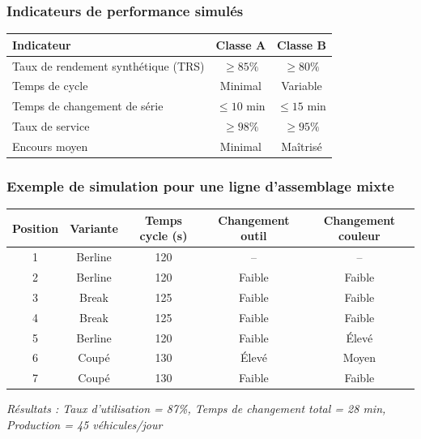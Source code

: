 \documentclass{article}
\begin{document}
\begin{table}[h]
\subsubsection{Indicateurs de performance simulés}

\begin{table}[h]
\centering
\begin{tabular}{|l|c|c|}
\hline
\textbf{Indicateur} & \textbf{Classe A} & \textbf{Classe B} \\
\hline
Taux de rendement synthétique (TRS) & $\geq 85\%$ & $\geq 80\%$ \\
Temps de cycle & Minimal & Variable \\
Temps de changement de série & $\leq 10$ min & $\leq 15$ min \\
Taux de service & $\geq 98\%$ & $\geq 95\%$ \\
Encours moyen & Minimal & Maîtrisé \\
\hline
\end{tabular}
\end{table}

\subsubsection{Exemple de simulation pour une ligne d'assemblage mixte}

\begin{tcolorbox}[colback=grisclair, colframe=gray!70!black, title=Simulation de séquencement - Ligne automobile]
\begin{tabular}{|c|c|c|c|c|}
\hline
\textbf{Position} & \textbf{Variante} & \textbf{Temps cycle (s)} & \textbf{Changement outil} & \textbf{Changement couleur} \\
\hline
1 & Berline & 120 & -- & -- \\
2 & Berline & 120 & Faible & Faible \\
3 & Break & 125 & Faible & Faible \\
4 & Break & 125 & Faible & Faible \\
5 & Berline & 120 & Faible & Élevé \\
6 & Coupé & 130 & Élevé & Moyen \\
7 & Coupé & 130 & Faible & Faible \\
\hline
\end{tabular}
\vspace{0.5em}
\textit{Résultats : Taux d'utilisation = 87\%, Temps de changement total = 28 min, Production = 45 véhicules/jour}
\end{tcolorbox}


\end{table}
\end{document}
